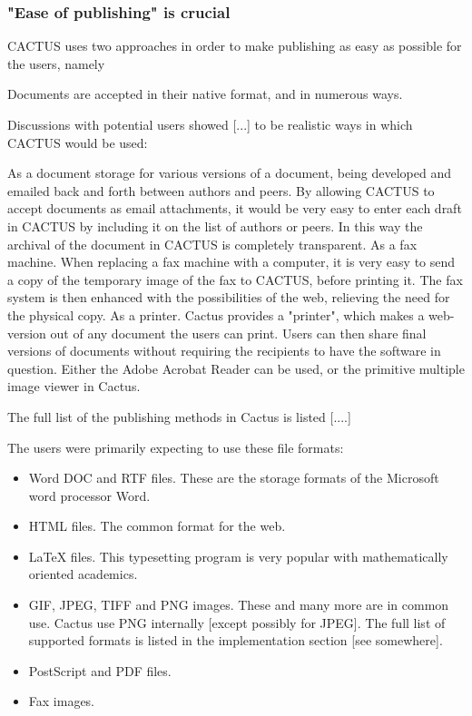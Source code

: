 \subsubsection{"Ease of publishing" is crucial}

CACTUS uses two approaches in order to make publishing as easy as
possible for the users, namely

\begin{center}
  Documents are accepted in their native format, and in numerous ways.
\end{center}

Discussions with potential users showed [...] to be realistic ways in
which CACTUS would be used:

As a document storage for various versions of a document, being
developed and emailed back and forth between authors and peers.  By
allowing CACTUS to accept documents as email attachments, it would be
very easy to enter each draft in CACTUS by including it on the list of
authors or peers.  In this way the archival of the document in CACTUS
is completely transparent.  As a fax machine.  When replacing a fax
machine with a computer, it is very easy to send a copy of the
temporary image of the fax to CACTUS, before printing it.  The fax
system is then enhanced with the possibilities of the web, relieving
the need for the physical copy.  As a printer.  Cactus provides a
"printer", which makes a web-version out of any document the users can
print.  Users can then share final versions of documents without
requiring the recipients to have the software in question.  Either the
Adobe Acrobat Reader can be used, or the primitive multiple image
viewer in Cactus.

The full list of the publishing methods in Cactus is listed [....]

The users were primarily expecting to use these file formats:

\begin{itemize}
  
\item 
  Word DOC and RTF files.   These are the storage formats of the
  Microsoft word processor Word.  
\item 
  HTML files.  The common format for the web.
\item 
  LaTeX files.   This typesetting program is very popular with
  mathematically oriented academics.
\item 
  GIF, JPEG, TIFF and PNG images.   These and many more are in common use.  Cactus use PNG internally [except possibly for JPEG].  The full list of supported
formats is listed in the implementation section [see somewhere].
\item 
  PostScript and PDF files.
\item 
  Fax images.
\end{itemize}

